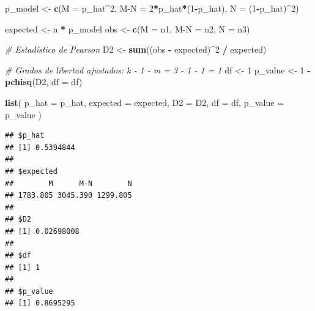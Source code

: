 \documentclass[
]{article}
\newenvironment{Shaded}{\begin{snugshade}}{\end{snugshade}}
\newcommand{\AttributeTok}[1]{\textcolor[rgb]{0.13,0.29,0.53}{#1}}
\newcommand{\CommentTok}[1]{\textcolor[rgb]{0.56,0.35,0.01}{\textit{#1}}}
\newcommand{\DecValTok}[1]{\textcolor[rgb]{0.00,0.00,0.81}{#1}}
\newcommand{\FunctionTok}[1]{\textcolor[rgb]{0.13,0.29,0.53}{\textbf{#1}}}
\newcommand{\NormalTok}[1]{#1}
\newcommand{\OtherTok}[1]{\textcolor[rgb]{0.56,0.35,0.01}{#1}}
\newcommand{\SpecialCharTok}[1]{\textcolor[rgb]{0.81,0.36,0.00}{\textbf{#1}}}
\newcommand{\StringTok}[1]{\textcolor[rgb]{0.31,0.60,0.02}{#1}}
\begin{document}
\begin{Shaded}
\begin{Highlighting}[]
\NormalTok{p\_model }\OtherTok{\textless{}{-}} \FunctionTok{c}\NormalTok{(}\AttributeTok{M =}\NormalTok{ p\_hat}\SpecialCharTok{\^{}}\DecValTok{2}\NormalTok{,}
             \StringTok{\textasciigrave{}}\AttributeTok{M{-}N}\StringTok{\textasciigrave{}} \OtherTok{=} \DecValTok{2}\SpecialCharTok{*}\NormalTok{p\_hat}\SpecialCharTok{*}\NormalTok{(}\DecValTok{1}\SpecialCharTok{{-}}\NormalTok{p\_hat),}
             \AttributeTok{N =}\NormalTok{ (}\DecValTok{1}\SpecialCharTok{{-}}\NormalTok{p\_hat)}\SpecialCharTok{\^{}}\DecValTok{2}\NormalTok{)}

\NormalTok{expected }\OtherTok{\textless{}{-}}\NormalTok{ n }\SpecialCharTok{*}\NormalTok{ p\_model}
\NormalTok{obs }\OtherTok{\textless{}{-}} \FunctionTok{c}\NormalTok{(}\AttributeTok{M =}\NormalTok{ n1, }\StringTok{\textasciigrave{}}\AttributeTok{M{-}N}\StringTok{\textasciigrave{}} \OtherTok{=}\NormalTok{ n2, }\AttributeTok{N =}\NormalTok{ n3)}

\CommentTok{\# Estadístico de Pearson}
\NormalTok{D2 }\OtherTok{\textless{}{-}} \FunctionTok{sum}\NormalTok{((obs }\SpecialCharTok{{-}}\NormalTok{ expected)}\SpecialCharTok{\^{}}\DecValTok{2} \SpecialCharTok{/}\NormalTok{ expected)}

\CommentTok{\# Grados de libertad ajustados: k {-} 1 {-} m = 3 {-} 1 {-} 1 = 1}
\NormalTok{df }\OtherTok{\textless{}{-}} \DecValTok{1}
\NormalTok{p\_value }\OtherTok{\textless{}{-}} \DecValTok{1} \SpecialCharTok{{-}} \FunctionTok{pchisq}\NormalTok{(D2, }\AttributeTok{df =}\NormalTok{ df)}

\FunctionTok{list}\NormalTok{(}
  \AttributeTok{p\_hat =}\NormalTok{ p\_hat,}
  \AttributeTok{expected =}\NormalTok{ expected,}
  \AttributeTok{D2 =}\NormalTok{ D2,}
  \AttributeTok{df =}\NormalTok{ df,}
  \AttributeTok{p\_value =}\NormalTok{ p\_value}
\NormalTok{)}
\end{Highlighting}
\end{Shaded}

\begin{verbatim}
## $p_hat
## [1] 0.5394844
## 
## $expected
##        M      M-N        N 
## 1783.805 3045.390 1299.805 
## 
## $D2
## [1] 0.02698008
## 
## $df
## [1] 1
## 
## $p_value
## [1] 0.8695295
\end{verbatim}
\end{document}
